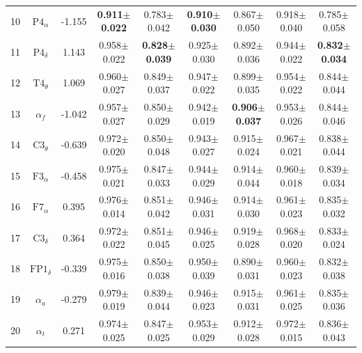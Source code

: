 \documentclass[pdflatex,sn-mathphys]{sn-jnl}%
\theoremstyle{thmstyleone}%
\theoremstyle{thmstyletwo}%
\theoremstyle{thmstylethree}%
\begin{document}
\begin{appendices}
\begin{table}[h!]
{\begin{tabular}{r|cccccccc}
  10 &          $\text{P4}_{\alpha}$ & -1.155 & \textbf{0.911$\pm$0.022} &          0.783$\pm$0.042 & \textbf{0.910$\pm$0.030} &          0.867$\pm$0.050 &          0.918$\pm$0.040 &          0.785$\pm$0.058 \\
  11 &          $\text{P4}_{\delta}$ &  1.143 &          0.958$\pm$0.022 & \textbf{0.828$\pm$0.039} &          0.925$\pm$0.030 &          0.892$\pm$0.036 &          0.944$\pm$0.022 & \textbf{0.832$\pm$0.034} \\
  12 &          $\text{T4}_{\theta}$ &  1.069 &          0.960$\pm$0.027 &          0.849$\pm$0.037 &          0.947$\pm$0.022 &          0.899$\pm$0.035 &          0.954$\pm$0.022 &          0.844$\pm$0.044 \\
  13 &                  $\alpha_{f}$ & -1.042 &          0.957$\pm$0.027 &          0.850$\pm$0.029 &          0.942$\pm$0.019 & \textbf{0.906$\pm$0.037} &          0.953$\pm$0.026 &          0.844$\pm$0.046 \\
  14 &          $\text{C3}_{\theta}$ & -0.639 &          0.972$\pm$0.020 &          0.850$\pm$0.048 &          0.943$\pm$0.027 &          0.915$\pm$0.024 &          0.967$\pm$0.021 &          0.838$\pm$0.044 \\
  15 &          $\text{F3}_{\alpha}$ & -0.458 &          0.975$\pm$0.021 &          0.847$\pm$0.033 &          0.944$\pm$0.029 &          0.914$\pm$0.044 &          0.960$\pm$0.018 &          0.839$\pm$0.034 \\
  16 &          $\text{F7}_{\alpha}$ &  0.395 &          0.976$\pm$0.014 &          0.851$\pm$0.042 &          0.946$\pm$0.031 &          0.914$\pm$0.030 &          0.961$\pm$0.023 &          0.835$\pm$0.032 \\
  17 &          $\text{C3}_{\delta}$ &  0.364 &          0.972$\pm$0.022 &          0.851$\pm$0.045 &          0.946$\pm$0.025 &          0.919$\pm$0.028 &          0.968$\pm$0.020 &          0.833$\pm$0.024 \\
  18 &         $\text{FP1}_{\delta}$ & -0.339 &          0.975$\pm$0.016 &          0.850$\pm$0.038 &          0.950$\pm$0.039 &          0.890$\pm$0.031 &          0.960$\pm$0.023 &          0.832$\pm$0.038 \\
  19 &                  $\alpha_{a}$ & -0.279 &          0.979$\pm$0.019 &          0.839$\pm$0.044 &          0.946$\pm$0.023 &          0.915$\pm$0.031 &          0.961$\pm$0.025 &          0.835$\pm$0.036 \\
  20 &                  $\alpha_{t}$ &  0.271 &          0.974$\pm$0.025 &          0.847$\pm$0.025 &          0.953$\pm$0.029 &          0.912$\pm$0.028 &          0.972$\pm$0.015 &          0.836$\pm$0.043 \\

\end{tabular}}
\end{table}
\end{appendices}
\end{document}
